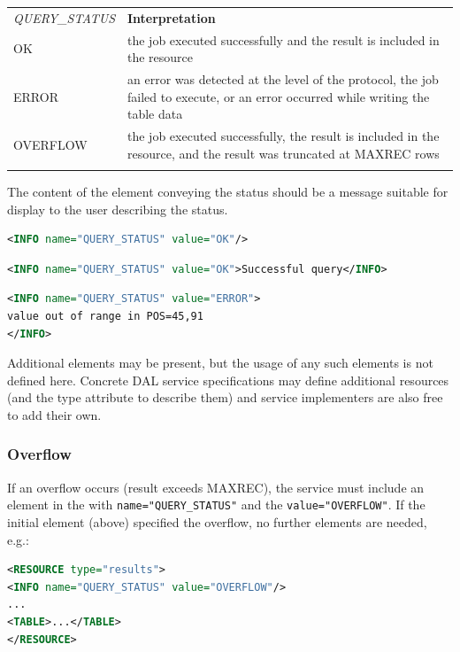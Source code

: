 \documentclass[11pt,letter]{ivoa}
\begin{document}
\begin{tabular}{l p{8cm}}
\sptablerule
\emph{QUERY\_STATUS}&\textbf{Interpretation}\\
\sptablerule
OK & the job executed successfully and the result is included in the resource \\
ERROR & an error was detected at the level of the protocol, the job failed to 
execute, or an error occurred while writing the table data \\
OVERFLOW & the job executed successfully, the result is included in the 
resource, and the result was truncated at MAXREC rows \\
\sptablerule
\label{tab:query-status}
\end{tabular}

The content of the  element conveying the status should be a message 
suitable for display to the user describing the status.

\begin{lstlisting}[language=XML]
<INFO name="QUERY_STATUS" value="OK"/>
\end{lstlisting}

\begin{lstlisting}[language=XML]
<INFO name="QUERY_STATUS" value="OK">Successful query</INFO>
\end{lstlisting}

\begin{lstlisting}[language=XML]
<INFO name="QUERY_STATUS" value="ERROR">
value out of range in POS=45,91
</INFO>
\end{lstlisting}

Additional  elements may be present, but the usage of any such elements 
is not defined here. Concrete DAL service specifications may define additional 
resources (and the type attribute to describe them) and service implementers are 
also free to add their own. 

\subsubsection{Overflow}
\label{sec:response-overflow}
If an overflow occurs (result exceeds MAXREC), the service must include an 
element in the  with \texttt{name="QUERY\_STATUS"} and the 
\texttt{value="OVERFLOW"}. If 
the initial  element (above) specified the overflow, no further elements are 
needed, e.g.:

\begin{lstlisting}[language=XML]
<RESOURCE type="results">
<INFO name="QUERY_STATUS" value="OVERFLOW"/>
...
<TABLE>...</TABLE>
</RESOURCE>
\end{lstlisting}
\end{document}
